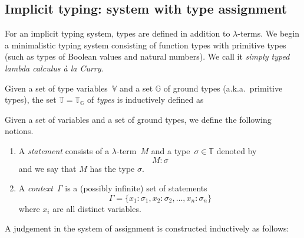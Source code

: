 \subsection{Implicit typing: system with type assignment}
For an implicit typing system, types are defined in addition to $\lambda$-terms.
We begin a minimalistic typing system consisting of function types with primitive
types (such as types of Boolean values and natural numbers). We call it
\emph{simply typed lambda calculus \textit{\`a la} Curry}.
\begin{definition}
  Given a set of type variables~$\mathbb{V}$ and a set $\mathbb{G}$ of ground
  types (a.k.a.\ primitive types), the set $\mathbb{T} = \mathbb{T}_\mathbb{G}$
  of \emph{types} is inductively defined as
  \begin{multicols}{3}
    \begin{prooftree}
    \end{prooftree}
    \begin{prooftree}
    \end{prooftree}
    \begin{prooftree}
    \end{prooftree}
  \end{multicols}
\end{definition}
\begin{definition}
  Given a set of variables and a set of ground types, we define the following
  notions.
  \begin{enumerate}
    \item A \emph{statement} consists of a $\lambda$-term~$M$
      and a type~$\sigma \in \mathbb{T}$ denoted by 
      \[
        M : \sigma
      \]
      and we say that $M$ has the type $\sigma$.
    \item A \emph{context}~$\Gamma$ is a (possibly infinite) set of statements 
      \[
        \Gamma = \{x_1 : \sigma_1, x_2 : \sigma_2, \ldots, x_n : \sigma_n\}
      \]
      where $x_i$ are all distinct variables. 
  \end{enumerate}
\end{definition}
A judgement in the system of assignment is constructed inductively as follows:
